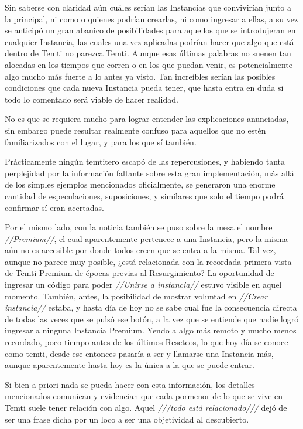 \documentclass[
  spanish,
]{book}
\begin{document}
Sin saberse con claridad aún cuáles serían las Instancias que convivirían junto a la principal, ni como o quienes podrían crearlas, ni como ingresar a ellas, a su vez se anticipó un gran abanico de posibilidades para aquellos que se introdujeran en cualquier Instancia, las cuales una vez aplicadas podrían hacer que algo que está dentro de Temti no parezca Temti.
Aunque esas últimas palabras no suenen tan alocadas en los tiempos que corren o en los que puedan venir, es potencialmente algo mucho más fuerte a lo antes ya visto. Tan increíbles serían las posibles condiciones que cada nueva Instancia pueda tener, que hasta entra en duda si todo lo comentado será viable de hacer realidad.

No es que se requiera mucho para lograr entender las explicaciones anunciadas, sin embargo puede resultar realmente confuso para aquellos que no estén familiarizados con el lugar, y para los que sí también.

Prácticamente ningún temtitero escapó de las repercusiones, y habiendo tanta perplejidad por la información faltante sobre esta gran implementación, más allá de los simples ejemplos mencionados oficialmente, se generaron una enorme cantidad de especulaciones, suposiciones, y similares que solo el tiempo podrá confirmar sí eran acertadas.

Por el mismo lado, con la noticia también se puso sobre la mesa el nombre \emph{//Premium//}, el cual aparentemente pertenece a una Instancia, pero la misma aún no es accesible por donde todos creen que se entra a la misma. Tal vez, aunque no parece muy posible, ¿está relacionada con la recordada primera vista de Temti Premium de épocas previas al Resurgimiento?
La oportunidad de ingresar un código para poder \emph{//Unirse a instancia//} estuvo visible en aquel momento. También, antes, la posibilidad de mostrar voluntad en \emph{//Crear instancia//} estaba, y hasta día de hoy no se sabe cual fue la consecuencia directa de todas las veces que se pulsó ese botón, a la vez que se entiende que nadie logró ingresar a ninguna Instancia Premium.
Yendo a algo más remoto y mucho menos recordado, poco tiempo antes de los últimos Reseteos, lo que hoy día se conoce como temti, desde ese entonces pasaría a ser y llamarse una Instancia más, aunque aparentemente hasta hoy es la única a la que se puede entrar.

Si bien a priori nada se pueda hacer con esta información, los detalles mencionados comunican y evidencian que cada pormenor de lo que se vive en Temti suele tener relación con algo. Aquel \emph{///todo está relacionado///} dejó de ser una frase dicha por un loco a ser una objetividad al descubierto.
\end{document}
